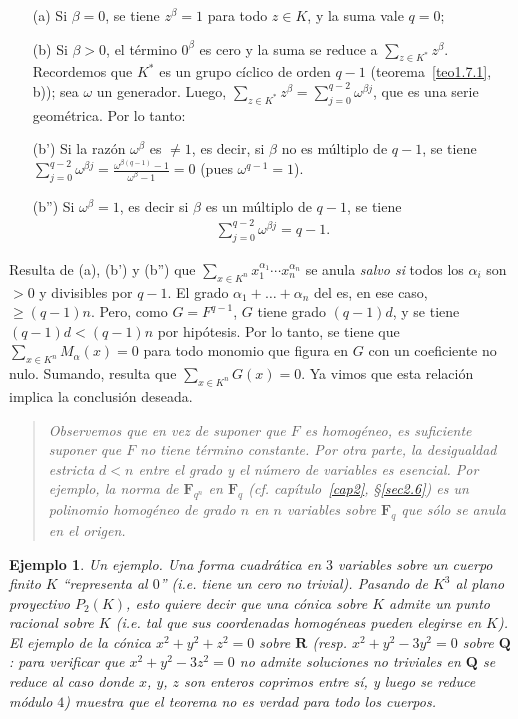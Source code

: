 \documentclass[bibtotoc,leqno,spanish]{amsbook}
\newcommand{\RR}{\mathbf{R}}
\newcommand{\QQ}{\mathbf{Q}}
\newcommand{\FF}{\mathbf{F}}
\numberwithin{equation}{section}
\newenvironment{comm}%
	{\begin{quotation}\itshape}
	{\end{quotation}}
\theoremstyle{note}
\theoremstyle{note}
\theoremstyle{rem}
\newtheorem*{example*}{Ejemplo}
\numberwithin{theorem}{section}
\numberwithin{proposition}{section}
\numberwithin{definition}{section}
\numberwithin{lemma}{section}
\numberwithin{corollary}{section}
\numberwithin{example}{section}
\numberwithin{footnote}{section}%
\begin{document}
\begin{enumerate}
\item[(a)] Si $\beta = 0$, se tiene $z^{\beta} =1$ para todo $z\in K$, y la suma vale $q = 0$;

\item[(b)] Si $\beta > 0$, el t\'ermino $0^{\beta}$ es cero y la suma se reduce a $\sum_{z\in K^{*}}z^{\beta}$. Recordemos
que $K^{*}$ es un grupo c\'iclico de orden $q-1$ (teorema~\ref{teo1.7.1}, b));
sea $\omega$ un generador. Luego,
$\sum_{z\in K^{*}}z^{\beta} = \sum_{j=0}^{q-2}\omega^{\beta j}$, que es una serie geom\'etrica. Por lo tanto:

\item[(b')] Si la raz\'on $\omega^{\beta}$ es $\neq 1$, es decir, si $\beta$ no es m\'ultiplo de $q-1$, se tiene
$\sum_{j=0}^{q-2}\omega^{\beta j} = \frac{\omega^{\beta(q-1)}-1}{\omega^{\beta}-1} = 0$ (pues $\omega^{q-1} = 1$).

\item[(b'')] Si $\omega^{\beta} = 1$, es decir si $\beta$ es un m\'ultiplo de $q-1$, se tiene
\begin{gather*}
\sum_{j=0}^{q-2}\omega^{\beta j} = q-1.
\end{gather*}
\end{enumerate}
Resulta de (a), (b') y (b'') que $\sum_{x\in K^{n}}x_{1}^{\alpha_{1}}\cdots x_{n}^{\alpha_{n}}$ se anula {\em salvo
si} todos los $\alpha_{i}$ son $>0$ y divisibles por $q-1$. El grado $\alpha_{1}+\dots+\alpha_{n}$ del
es, en ese caso, $\geq (q-1)n$. Pero, como $G = F^{q-1}$, $G$ tiene grado $(q-1)d$, y se tiene
$(q-1)d < (q-1)n$ por hip\'otesis. Por lo tanto, se tiene que $\sum_{x\in K^{n}}M_{\alpha}(x) = 0$ para todo
monomio que figura en $G$ con un coeficiente no nulo. Sumando, resulta que $\sum_{x\in K^{n}}G(x) = 0$. Ya vimos
que esta relaci\'on implica la conclusi\'on deseada.

\begin{comm}
Observemos que en vez de suponer que $F$ es homog\'eneo, es suficiente suponer que $F$ no tiene t\'ermino constante.
Por otra parte, la desigualdad {\em estricta} $d < n$ entre el grado y el n\'umero de variables es esencial.
Por ejemplo, la {\em norma} de $\FF_{q^{n}}$ en $\FF_{q}$ (cf. cap\'itulo~\ref{cap2}, \S\ref{sec2.6}) es un polinomio
homog\'eneo de grado $n$ en $n$ variables sobre $\FF_{q}$ que s\'olo se anula en el origen.
\end{comm}

\begin{example*}
{\itshape Un ejemplo.} Una forma cuadr\'atica en $3$ variables sobre un cuerpo {\em finito} $K$
``representa al $0$'' (i.e. tiene un cero no trivial). Pasando de $K^{3}$ al plano proyectivo
$P_{2}(K)$, esto quiere decir que una {\em c\'onica} sobre $K$ admite un punto racional sobre $K$
(i.e. tal que sus coordenadas homog\'eneas pueden elegirse en $K$). El ejemplo de la c\'onica
$x^{2}+y^{2}+z^{2}=0$ sobre $\RR$ (resp. $x^{2}+y^{2}-3y^{2}=0$ sobre $\QQ$: para verificar que
$x^{2}+y^{2}-3z^{2}=0$ no admite soluciones no triviales en $\QQ$ se reduce al caso donde $x$, $y$, $z$
son enteros coprimos entre s\'i, y luego se reduce m\'odulo $4$) muestra que el teorema no es verdad para
todo los cuerpos.
\end{example*}
\end{document}
